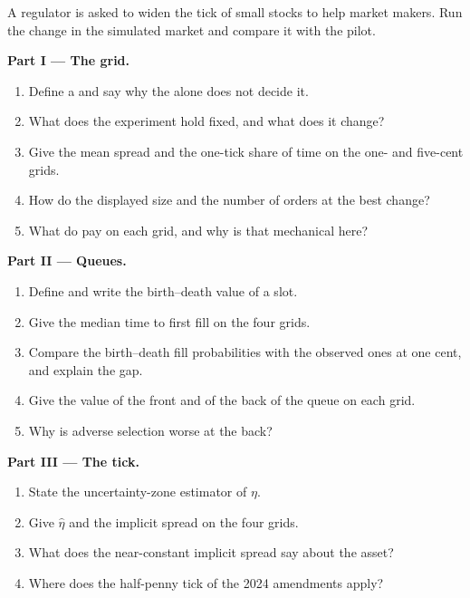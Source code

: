 \begin{problem}\label{pb:mx:tick-size-queues-and-priority:1}
A regulator is asked to widen the tick of small stocks to help market makers. Run the change in the simulated market and compare it with the pilot.

\medskip\noindent\textbf{Part I --- The grid.}
\begin{enumerate}
\item Define a  and say why the  alone does not decide it.
\item What does the experiment hold fixed, and what does it change?
\item Give the mean spread and the one-tick share of time on the one- and five-cent grids.
\item How do the displayed size and the number of orders at the best change?
\item What do  pay on each grid, and why is that mechanical here?
\end{enumerate}

\medskip\noindent\textbf{Part II --- Queues.}
\begin{enumerate}[resume]
\item Define  and write the birth--death value of a slot.
\item Give the median time to first fill on the four grids.
\item Compare the birth--death fill probabilities with the observed ones at one cent, and explain the gap.
\item Give the value of the front and of the back of the queue on each grid.
\item Why is adverse selection worse at the back?
\end{enumerate}

\medskip\noindent\textbf{Part III --- The tick.}
\begin{enumerate}[resume]
\item State the uncertainty-zone estimator of $\eta$.
\item Give $\hat\eta$ and the implicit spread on the four grids.
\item What does the near-constant implicit spread say about the asset?
\item Where does the half-penny tick of the 2024 amendments apply?
\end{enumerate}


\end{problem}
